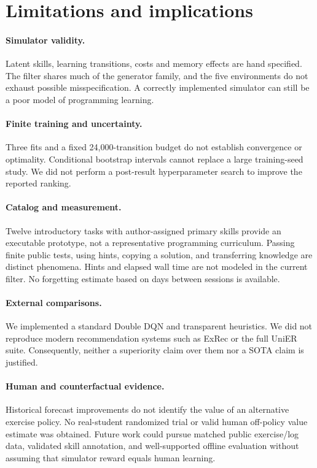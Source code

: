 \documentclass[11pt,a4paper]{article}
\begin{document}
\section{Limitations and implications}
\paragraph{Simulator validity.} Latent skills, learning transitions, costs and memory effects are hand specified. The filter shares much of the generator family, and the five environments do not exhaust possible misspecification. A correctly implemented simulator can still be a poor model of programming learning.
\paragraph{Finite training and uncertainty.} Three fits and a fixed 24,000-transition budget do not establish convergence or optimality. Conditional bootstrap intervals cannot replace a large training-seed study. We did not perform a post-result hyperparameter search to improve the reported ranking.
\paragraph{Catalog and measurement.} Twelve introductory tasks with author-assigned primary skills provide an executable prototype, not a representative programming curriculum. Passing finite public tests, using hints, copying a solution, and transferring knowledge are distinct phenomena. Hints and elapsed wall time are not modeled in the current filter. No forgetting estimate based on days between sessions is available.
\paragraph{External comparisons.} We implemented a standard Double DQN and transparent heuristics. We did not reproduce modern recommendation systems such as ExRec or the full UniER suite. Consequently, neither a superiority claim over them nor a SOTA claim is justified.
\paragraph{Human and counterfactual evidence.} Historical forecast improvements do not identify the value of an alternative exercise policy. No real-student randomized trial or valid human off-policy value estimate was obtained. Future work could pursue matched public exercise/log data, validated skill annotation, and well-supported offline evaluation without assuming that simulator reward equals human learning.
\end{document}
